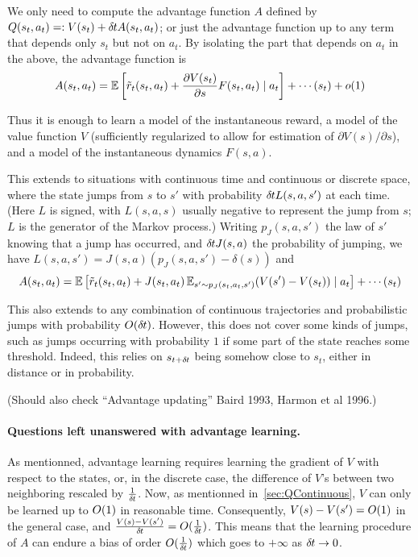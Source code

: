 We only need to compute the advantage function $A$ defined by
$Q(s_t,a_t)=\mathrel{\mathop{:}} V(s_t)+\delta\hspace{-.06em}t A(s_t,a_t)$; or just the advantage function
up to any term that depends only $s_t$ but not on $a_t$. By isolating the
part that
depends on $a_t$ in the above, the advantage function is
\begin{equation}
A(s_t,a_t)=\mathbb{E}\left[\tilde{r}_t(s_t,a_t)+\frac{\partial
V(s_t)}{\partial
s}F(s_t,a_t)\mid a_t\right]+\cdots(s_t)+o(1)
\end{equation}

Thus it is enough to learn a model of the instantaneous reward, a model
of the value function $V$ (sufficiently regularized to allow for
estimation of $\partial V(s)/\partial s$), and a model of the
instantaneous dynamics $F(s,a)$.

This extends to situations with continuous time and continuous or
discrete space, where the state jumps from $s$ to $s'$ with probability $\delta\hspace{-.06em}t
L(s,a,s')$ at each time. (Here $L$ is signed, with $L(s,a,s)$ usually
negative to represent the jump from $s$; $L$ is the generator of the
Markov process.) Writing $p_J(s,a,s')$ the law of
$s'$ knowing that a jump has occurred, and $\delta\hspace{-.06em}t J(s,a)$ the
probability of jumping, we have $L(s,a,s')=J(s,a)(p_J(s,a,s')-\delta(s))$
and
\begin{equation}
A(s_t,a_t)=\mathbb{E}\left[\tilde{r}_t(s_t,a_t)+J(s_t,a_t)\,\mathbb{E}_{s'\sim
p_J(s_t,a_t,s')} (V(s')-V(s_t))
\mid a_t\right]+\cdots(s_t)
\end{equation}

This also extends to any combination of continuous trajectories and
probabilistic jumps with probability $O(\delta\hspace{-.06em}t)$. However, this does not
cover some kinds of jumps, such as jumps occurring with probability $1$
if some part of the state reaches some threshold. Indeed, this relies on
$s_{t+\delta\hspace{-.06em}t}$ being somehow close to $s_t$, either in distance or in
probability.

(Should also check ``Advantage updating'' Baird 1993, Harmon et al 1996.)

\paragraph{Questions left unanswered with advantage learning.}
As mentionned, advantage learning requires learning the gradient of $V$
with respect to the states, or, in the discrete case, the difference of
$V$'s between two neighboring rescaled by $\frac{1}{\delta\hspace{-.06em}t}$. Now, as
mentionned in~\ref{sec:QContinuous}, $V$ can only be learned up to $O (1)$
in reasonable time. Consequently, $V(s) - V(s') = O (1)$ in the general case,
and $\frac{V(s) - V(s')}{\delta\hspace{-.06em}t} = O (\frac{1}{\delta\hspace{-.06em}t})$. This means that
the learning procedure of $A$ can endure a bias of order $O (\frac{1}{\delta\hspace{-.06em}t})$
which goes to $+\infty$ as $\delta\hspace{-.06em}t \to 0$.

